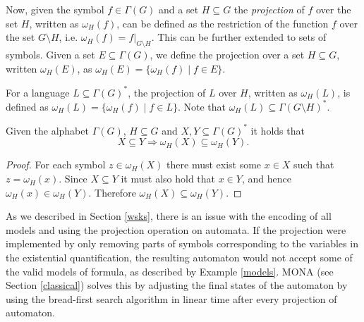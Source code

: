 Now, given the symbol $f \in \Gamma(G)$ and a set $H \subseteq G$ the
\emph{projection} of $f$ over the set $H$, written as $\omega_H(f)$, can be
defined as the restriction of the function $f$ over the set $G\setminus H$, i.e.
$\omega_H(f) = f|_{G\setminus H}$. This can be further extended to sets of symbols. Given a
set $E \subseteq \Gamma(G)$, we define the projection over a set $H \subseteq
G$, written $\omega_H(E)$, as $\omega_H(E) = \{\omega_H(f) \mid f \in E\}$.

For a language $L \subseteq \Gamma(G)^*$, the projection of $L$ over $H$,
written as $\omega_H(L)$, is defined as $\omega_H(L) = \{\omega_H(f) \mid f \in
L\}$. Note that $\omega_H(L) \subseteq \Gamma(G\setminus H)^*$.

\begin{lemma} Given the alphabet $\Gamma(G)$, $H \subseteq G$ and $X, Y
\subseteq \Gamma(G)^*$ it holds that
\begin{equation}
 X \subseteq Y \Longrightarrow \omega_H(X) \subseteq \omega_H(Y).
\end{equation}
\end{lemma}
\begin{proof}
For each symbol $z \in \omega_H(X)$ there must exist some $x \in X$ such that
$z = \omega_H(x)$. Since $X \subseteq Y$ it must also hold that $x \in Y$, and
hence $\omega_H(x) \in \omega_H(Y)$. Therefore $\omega_H(X) \subseteq
\omega_H(Y)$.
\end{proof}

As we described in Section \ref{wsks}, there is an issue with the encoding of
all models and using the projection operation on automata. If the projection
were implemented by only removing parts of symbols corresponding to the
variables in the existential quantification, the resulting automaton
would not accept some of the valid models of formula,
as described by Example \ref{models}. \textsc{MONA} (see Section
\ref{classical}) solves this by adjusting the final states of the automaton by
using the bread-first search algorithm in linear time after every projection of
automaton.


